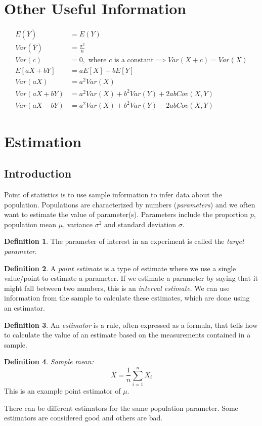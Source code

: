\documentclass[12 pt]{article}
\theoremstyle{definition}
\newtheorem{defn}{Definition}
\begin{document}
        \section*{Other Useful Information}
        \begin{align*}
          E(\overline{Y}) & = E(Y)
          \\ Var(\overline{Y}) & = \frac{\sigma^2}{n}
          \\ Var(c) & = 0, \text{ where }c \text{ is a constant} \implies Var(X+c) = Var(X)
          \\ E[aX+bY] & = aE[X]+bE[Y]
          \\ Var(aX) & = a^2Var(X)
          \\ Var(aX+bY) & = a^2Var(X)+b^2Var(Y) + 2 abCov(X,Y)
          \\ Var(aX-bY) & = a^2Var(X)+b^2Var(Y) - 2 abCov(X,Y)
        \end{align*}
        \setcounter{section}{7}
        \section{Estimation}
        \subsection{Introduction}
        Point of statistics is to use sample information to infer data
        about the population. Populations are characterized by numbers
        (\textit{parameters}) and we often want to estimate the value
        of parameter(s). Parameters include the proportion $p$,
        population mean $\mu$, variance $\sigma^2$ and standard
        deviation $\sigma$.
        \begin{defn}
          The parameter of interest in an experiment is called the
          \textit{target parameter}.
        \end{defn}
        \begin{defn}
          A \textit{point estimate} is a type of estimate where we use
          a single value/point to estimate a parameter. If we estimate
          a parameter by saying that it might fall between two
          numbers, this is an \textit{interval estimate}. We can use
          information from the sample to calculate these estimates,
          which are done using an estimator.
        \end{defn}
        \begin{defn}
          An \textit{estimator} is a rule, often expressed as a
          formula, that tells how to calculate the value of an
          estimate based on the measurements contained in a sample.
        \end{defn}
        \begin{defn}
          \textit{Sample mean:}
          $$\overline{X} = \frac{1}{n} \sum_{i=1}^n X_i$$ This is an
          example point estimator of $\mu$.
        \end{defn}
        There can be different estimators for the same population
        parameter. Some estimators are considered good and others are bad.
\end{document}
